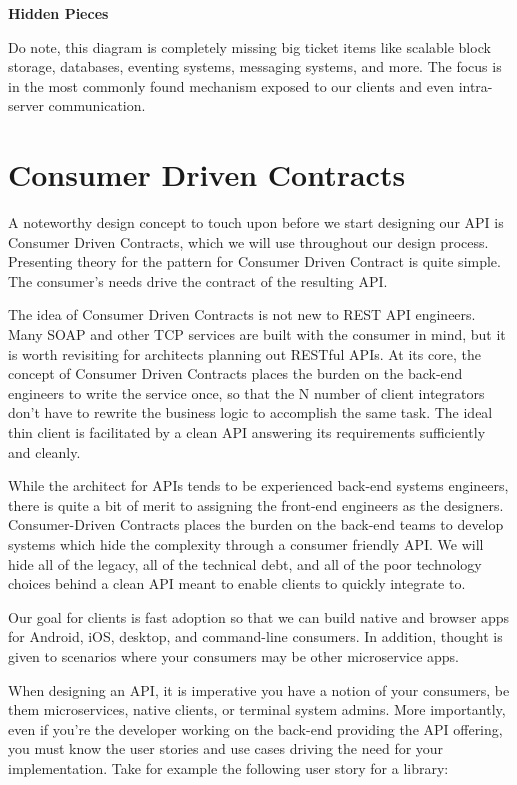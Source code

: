 \begin{sidebar}
\begin{center}
\textbf{Hidden Pieces}
\end{center}

Do note, this diagram is completely missing big ticket items like scalable block storage, databases, eventing systems, messaging systems, and more.  The focus is in the most commonly found mechanism exposed to our clients and even intra-server communication.

\end{sidebar}

\section{Consumer Driven Contracts}

A noteworthy design concept to touch upon before we start designing our API is Consumer Driven Contracts, which we will use throughout our design process.  Presenting theory for the pattern for Consumer Driven Contract is quite simple.  The consumer's needs drive the contract of the resulting API.

The idea of Consumer Driven Contracts is not new to REST API engineers.  Many SOAP and other TCP services are built with the consumer in mind, but it is worth revisiting for architects planning out RESTful APIs.  At its core, the concept of Consumer Driven Contracts places the burden on the back-end engineers to write the service once, so that the N number of client integrators don't have to rewrite the business logic to accomplish the same task.  The ideal thin client is facilitated by a clean API answering its requirements sufficiently and cleanly.

While the architect for APIs tends to be experienced back-end systems engineers, there is quite a bit of merit to assigning the front-end engineers as the designers. Consumer-Driven Contracts places the burden on the back-end teams to develop systems which hide the complexity through a consumer friendly API. We will hide all of the legacy, all of the technical debt, and all of the poor technology choices behind a clean API meant to enable clients to quickly integrate to.

Our goal for clients is fast adoption so that we can build native and browser apps for Android, iOS, desktop, and command-line consumers.  In addition, thought is given to scenarios where your consumers may be other microservice apps.

When designing an API, it is imperative you have a notion of your consumers, be them microservices, native clients, or terminal system admins.  More importantly, even if you're the developer working on the back-end providing the API offering, you must know the user stories and use cases driving the need for your implementation. Take for example the following user story for a library:

